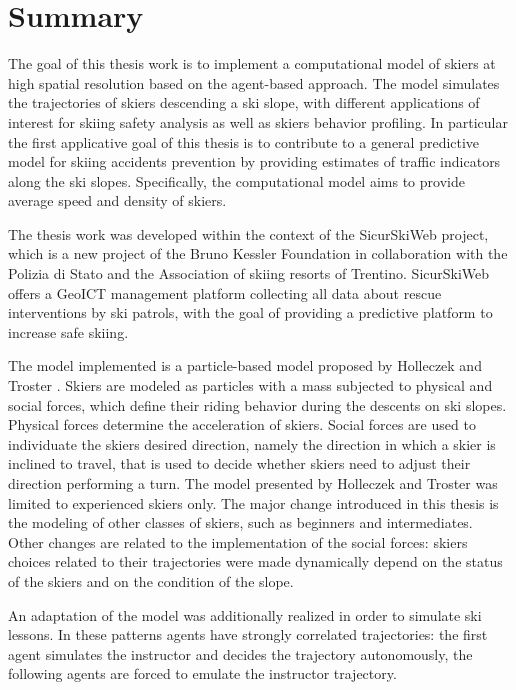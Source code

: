 \documentclass[12pt,a4paper,twoside]{book}
\begin{document}
\chapter*{Summary}
The goal of this thesis work is to implement a computational model of skiers at high spatial resolution based on the agent-based approach. The model simulates the trajectories of skiers descending a ski slope, with different applications of interest for skiing safety analysis as well as skiers behavior profiling. In particular the first applicative goal of this thesis is to contribute to a general predictive model for skiing accidents prevention by providing estimates of traffic indicators along the ski slopes. Specifically, the computational model aims to provide average speed and density of skiers.

The thesis work was developed within the context of the SicurSkiWeb project, which is a new project of the Bruno Kessler Foundation in collaboration with the Polizia di Stato and the Association of skiing resorts of Trentino. SicurSkiWeb offers a GeoICT management platform collecting all data about rescue interventions by ski patrols, with the goal of providing a predictive platform to increase safe skiing.

The model implemented is a particle-based model proposed by Holleczek and Troster \cite{hol2012}. Skiers are modeled as particles with a mass subjected to physical and social forces, which define their riding behavior during the descents on ski slopes. Physical forces determine the acceleration of skiers. Social forces are used to individuate the skiers desired direction, namely the direction in which a skier is inclined to travel, that is used to decide whether skiers need to adjust their direction performing a turn. The model presented by Holleczek and Troster was limited to experienced skiers only. The major change introduced in this thesis is the modeling of other classes of skiers, such as beginners and intermediates. Other changes are related to the implementation of the social forces: skiers choices related to their trajectories were made dynamically depend on the status of the skiers and on the condition of the slope.

An adaptation of the model was additionally realized in order to simulate ski lessons. In these patterns agents have strongly correlated trajectories: the first agent simulates the instructor and decides the trajectory autonomously, the following agents are forced to emulate the instructor trajectory.
\end{document}
